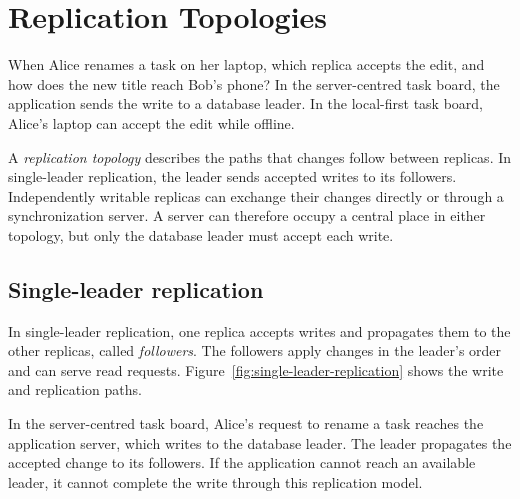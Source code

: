 \section{Replication Topologies}
\label{sec:replication-topologies}

When Alice renames a task on her laptop, which replica accepts the edit, and how does the new title reach Bob's phone?
In the server-centred task board, the application sends the write to a database leader.
In the local-first task board, Alice's laptop can accept the edit while offline.

A \emph{replication topology} describes the paths that changes follow between replicas.
In single-leader replication, the leader sends accepted writes to its followers.
Independently writable replicas can exchange their changes directly or through a synchronization server.
A server can therefore occupy a central place in either topology, but only the database leader must accept each write.
\parencites[152, 168, 175]{designing-data-intensive-applications}[173]{local-first-software}

\subsection{Single-leader replication}

In single-leader replication, one replica accepts writes and propagates them to the other replicas, called \emph{followers}.
The followers apply changes in the leader's order and can serve read requests.
Figure~\ref{fig:single-leader-replication} shows the write and replication paths.
\parencite[181--182]{understanding-distributed-systems}

In the server-centred task board, Alice's request to rename a task reaches the application server, which writes to the database leader.
The leader propagates the accepted change to its followers.
If the application cannot reach an available leader, it cannot complete the write through this replication model.
\parencite[152--153, 168]{designing-data-intensive-applications}

\begin{illustration}[htbp]
	\centering
	\caption{Single-leader replication}
	\label{fig:single-leader-replication}
	\begingroup
	
	\endgroup
\end{illustration}
\FloatBarrier

